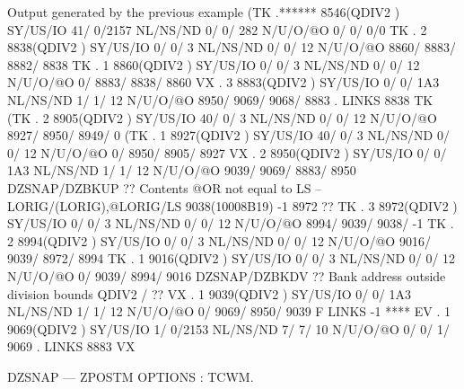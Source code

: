 \begin{Listing}{Output generated by the previous example}
(TK  .******     8546(QDIV2   ) SY/US/IO   41/    0/2157 NL/NS/ND    0/    0/     282 N/U/O/@O       0/       0/       0/0       
 TK  .     2     8838(QDIV2   ) SY/US/IO    0/    0/   3 NL/NS/ND    0/    0/      12 N/U/O/@O    8860/    8883/    8882/    8838
 TK  .     1     8860(QDIV2   ) SY/US/IO    0/    0/   3 NL/NS/ND    0/    0/      12 N/U/O/@O       0/    8883/    8838/    8860
 VX  .     3     8883(QDIV2   ) SY/US/IO    0/    0/ 1A3 NL/NS/ND    1/    1/      12 N/U/O/@O    8950/    9069/    9068/    8883
     . LINKS      8838 TK                                                                                                        
(TK  .     2     8905(QDIV2   ) SY/US/IO   40/    0/   3 NL/NS/ND    0/    0/      12 N/U/O/@O    8927/    8950/    8949/       0
(TK  .     1     8927(QDIV2   ) SY/US/IO   40/    0/   3 NL/NS/ND    0/    0/      12 N/U/O/@O       0/    8950/    8905/    8927
 VX  .     2     8950(QDIV2   ) SY/US/IO    0/    0/ 1A3 NL/NS/ND    1/    1/      12 N/U/O/@O    9039/    9069/    8883/    8950
 DZSNAP/DZBKUP ?? Contents @OR not equal to LS -- LORIG/(LORIG),@LORIG/LS                 9038(10008B19)      -1    8972       ?? 
 TK  .     3     8972(QDIV2   ) SY/US/IO    0/    0/   3 NL/NS/ND    0/    0/      12 N/U/O/@O    8994/    9039/    9038/      -1
 TK  .     2     8994(QDIV2   ) SY/US/IO    0/    0/   3 NL/NS/ND    0/    0/      12 N/U/O/@O    9016/    9039/    8972/    8994
 TK  .     1     9016(QDIV2   ) SY/US/IO    0/    0/   3 NL/NS/ND    0/    0/      12 N/U/O/@O       0/    9039/    8994/    9016
 DZSNAP/DZBKDV ?? Bank address outside division bounds                                QDIV2   /                                ?? 
 VX  .     1     9039(QDIV2   ) SY/US/IO    0/    0/ 1A3 NL/NS/ND    1/    1/      12 N/U/O/@O       0/    9069/    8950/    9039
     F LINKS        -1 ****                                                                                                      
 EV  .     1     9069(QDIV2   ) SY/US/IO    1/    0/2153 NL/NS/ND    7/    7/      10 N/U/O/@O       0/       0/       1/    9069
     . LINKS      8883 VX                                                                                                        
                                                                                                                                 
DZSNAP --- ZPOSTM                                                                                  OPTIONS : TCWM.               
                                                                                                                                 

\end{Listing}
